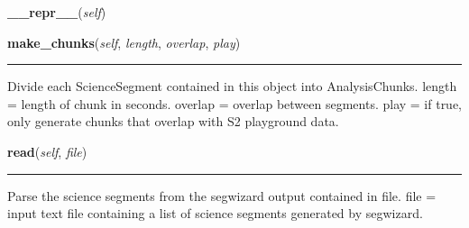     \label{pipeline:ScienceData:__repr__}
    \vspace{0.5ex}

    \noindent\begin{boxedminipage}{\textwidth}

    \raggedright \textbf{\_\_repr\_\_}(\textit{self})

    \end{boxedminipage}

    \label{pipeline:ScienceData:make_chunks}
    \vspace{0.5ex}

    \noindent\begin{boxedminipage}{\textwidth}

    \raggedright \textbf{make\_chunks}(\textit{self}, \textit{length}, \textit{overlap}, \textit{play})

    \vspace{-1.5ex}

    \rule{\textwidth}{0.5\fboxrule}
    Divide each ScienceSegment contained in this object into 
    AnalysisChunks. length = length of chunk in seconds. overlap = 
    overlap between segments. play = if true, only generate chunks that 
    overlap with S2 playground data.

    \vspace{1ex}

    \end{boxedminipage}

    \label{pipeline:ScienceData:read}
    \vspace{0.5ex}

    \noindent\begin{boxedminipage}{\textwidth}

    \raggedright \textbf{read}(\textit{self}, \textit{file})

    \vspace{-1.5ex}

    \rule{\textwidth}{0.5\fboxrule}
    Parse the science segments from the segwizard output contained in 
    file. file = input text file containing a list of science segments 
    generated by segwizard.

    \vspace{1ex}

    \end{boxedminipage}

